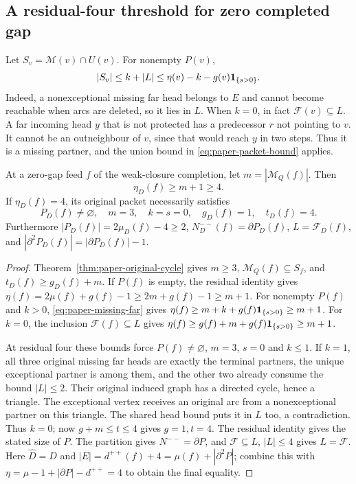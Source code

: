 \subsection{A residual-four threshold for zero completed gap}
Let $S_v=\mathcal M(v)\cap U(v)$. For nonempty $P(v)$,
\begin{equation}\label{eq:paper-missing-far}
 |S_v|\le k+|L|\le\eta(v)-k-g(v)\mathbf 1_{\{s>0\}}.
\end{equation}
Indeed, a nonexceptional missing far head belongs to $E$ and cannot become
reachable when arcs are deleted, so it lies in $L$. When $k=0$, in fact
$\mathcal F(v)\subseteq L$. A far incoming head $y$ that is not protected
has a predecessor $r$ not pointing to $v$. It cannot be an outneighbour of
$v$, since that would reach $y$ in two steps. Thus it is a missing partner,
and the union bound in \eqref{eq:paper-packet-bound} applies.

\begin{theorem}\label{thm:paper-eta-four}
At a zero-gap feed $f$ of the weak-closure completion, let
$m=|\mathcal M_Q(f)|$. Then
\[
 \eta_D(f)\ge m+1\ge4.
\]
If $\eta_D(f)=4$, its original packet necessarily satisfies
\[
 P_D(f)\ne\varnothing,\quad m=3,\quad k=s=0,\quad g_D(f)=1,
 \quad t_D(f)=4.
\]
Furthermore $|P_D(f)|=2\mu_D(f)-4\ge2$,
$N_D^{--}(f)=\partial P_D(f)$, $L=\mathcal F_D(f)$,
and $|\partial^2P_D(f)|=|\partial P_D(f)|-1$.
\end{theorem}
\begin{proof}
Theorem~\ref{thm:paper-original-cycle} gives $m\ge3$,
$\mathcal M_Q(f)\subseteq S_f$, and $t_D(f)\ge g_D(f)+m$.
If $P(f)$ is empty, the residual identity gives
$\eta(f)=2\mu(f)+g(f)-1\ge2m+g(f)-1\ge m+1$.
For nonempty $P(f)$ and $k>0$, \eqref{eq:paper-missing-far} gives
$\eta(f)\ge m+k+g(f)\mathbf 1_{\{s>0\}}\ge m+1$.
For $k=0$, the inclusion $\mathcal F(f)\subseteq L$ gives
$\eta(f)\ge g(f)+m+g(f)\mathbf 1_{\{s>0\}}\ge m+1$.

At residual four these bounds force $P(f)\ne\varnothing$, $m=3$,
$s=0$ and $k\le1$. If $k=1$, all three original missing far heads are
exactly the terminal partners, the unique exceptional partner is among
them, and the other two already consume the bound $|L|\le2$.
Their original induced graph has a directed cycle, hence a triangle.
The exceptional vertex receives an original arc from a nonexceptional
partner on this triangle. The shared head bound puts it in $L$ too,
a contradiction. Thus $k=0$; now $g+m\le t\le4$ gives $g=1,t=4$.
The residual identity gives the stated size of $P$. The partition gives
$N^{--}=\partial P$, and $\mathcal F\subseteq L$, $|L|\le4$ gives
$L=\mathcal F$. Here $\widehat D=D$ and
$|E|=d^{++}(f)+4=\mu(f)+|\partial^2P|$; combine this with
$\eta=\mu-1+|\partial P|-d^{++}=4$ to obtain the final equality.
\end{proof}

